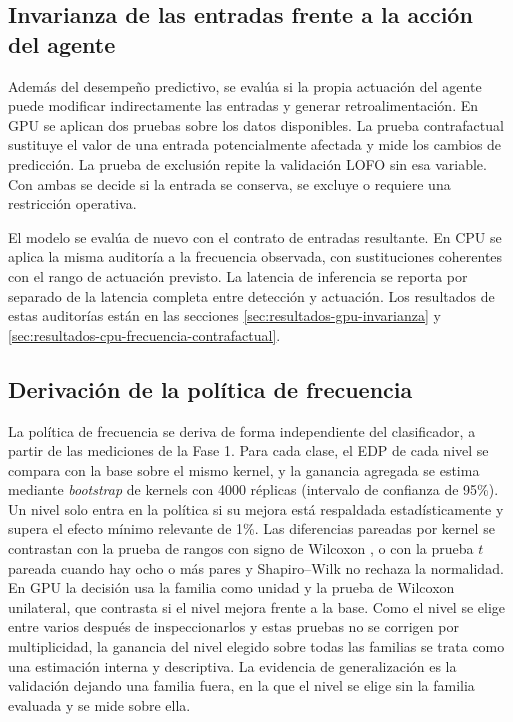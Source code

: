 \subsection{Invarianza de las entradas frente a la acción del agente}
\label{sec:metodologia-invarianza-gpu}

Además del desempeño predictivo, se evalúa si la propia actuación del agente puede modificar indirectamente las entradas y generar retroalimentación. En GPU se aplican dos pruebas sobre los datos disponibles. La prueba contrafactual sustituye el valor de una entrada potencialmente afectada y mide los cambios de predicción. La prueba de exclusión repite la validación LOFO sin esa variable. Con ambas se decide si la entrada se conserva, se excluye o requiere una restricción operativa.

El modelo se evalúa de nuevo con el contrato de entradas resultante. En CPU se aplica la misma auditoría a la frecuencia observada, con sustituciones coherentes con el rango de actuación previsto. La latencia de inferencia se reporta por separado de la latencia completa entre detección y actuación. Los resultados de estas auditorías están en las secciones \ref{sec:resultados-gpu-invarianza} y \ref{sec:resultados-cpu-frecuencia-contrafactual}.

\subsection{Derivación de la política de frecuencia}

La política de frecuencia se deriva de forma independiente del clasificador, a partir de las mediciones de la Fase 1. Para cada clase, el EDP de cada nivel se compara con la base sobre el mismo kernel, y la ganancia agregada se estima mediante \textit{bootstrap} de kernels con 4000 réplicas (intervalo de confianza de 95\%). Un nivel solo entra en la política si su mejora está respaldada estadísticamente y supera el efecto mínimo relevante de 1\%. Las diferencias pareadas por kernel se contrastan con la prueba de rangos con signo de Wilcoxon \cite{Hollander2014}, o con la prueba $t$ pareada cuando hay ocho o más pares y Shapiro--Wilk no rechaza la normalidad. En GPU la decisión usa la familia como unidad y la prueba de Wilcoxon unilateral, que contrasta si el nivel mejora frente a la base. Como el nivel se elige entre varios después de inspeccionarlos y estas pruebas no se corrigen por multiplicidad, la ganancia del nivel elegido sobre todas las familias se trata como una estimación interna y descriptiva. La evidencia de generalización es la validación dejando una familia fuera, en la que el nivel se elige sin la familia evaluada y se mide sobre ella.

